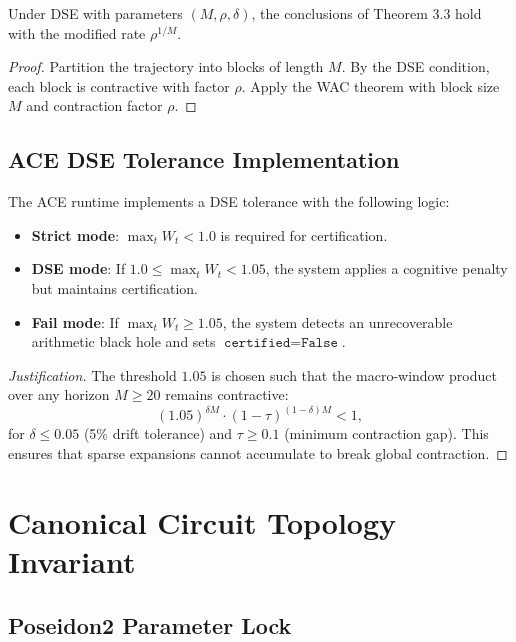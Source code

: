 \documentclass[11pt]{article}
\begin{document}
\begin{theorem}
Under DSE with parameters $(M, \rho, \delta)$, the conclusions of Theorem 3.3 hold with the modified rate $\rho^{1/M}$.
\end{theorem}

\begin{proof}
Partition the trajectory into blocks of length $M$. By the DSE condition, each block is contractive with factor $\rho$. Apply the WAC theorem with block size $M$ and contraction factor $\rho$.
\end{proof}

\subsection{ACE DSE Tolerance Implementation}

\begin{proposition}
The ACE runtime implements a DSE tolerance with the following logic:
\begin{itemize}
\item \textbf{Strict mode}: $\max_t W_t < 1.0$ is required for certification.
\item \textbf{DSE mode}: If $1.0 \leq \max_t W_t < 1.05$, the system applies a cognitive penalty but maintains certification.
\item \textbf{Fail mode}: If $\max_t W_t \geq 1.05$, the system detects an unrecoverable arithmetic black hole and sets $\texttt{certified} = \texttt{False}$.
\end{itemize}
\end{proposition}

\begin{proof}[Justification]
The threshold $1.05$ is chosen such that the macro-window product over any horizon $M \geq 20$ remains contractive:
\[
(1.05)^{\delta M} \cdot (1 - \tau)^{(1-\delta)M} < 1,
\]
for $\delta \leq 0.05$ (5\% drift tolerance) and $\tau \geq 0.1$ (minimum contraction gap). This ensures that sparse expansions cannot accumulate to break global contraction.
\end{proof}

\section{Canonical Circuit Topology Invariant}

\subsection{Poseidon2 Parameter Lock}
\end{document}
